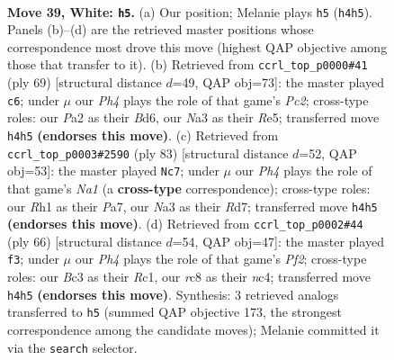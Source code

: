 \documentclass[11pt]{article}
\begin{document}
\clearpage

\begin{figure}[p]\centering
\begin{subfigure}{0.46\textwidth}\centering
\resizebox{\linewidth}{!}{%
\newchessgame
\chessboard[
  setfen={1rr3k1/pn3p2/1p2p1pp/8/2P4P/N1B1P3/PR2KPP1/7R w - - 1 39},
  showmover=false,
  pgfstyle=straightmove, color=movearrow, markmove={h4-h5}
]}
\caption{}
\end{subfigure}\hfill
\begin{subfigure}{0.46\textwidth}\centering
\resizebox{\linewidth}{!}{%
\newchessgame
\chessboard[
  setfen={8/2p3pk/3b1r2/P2pr2p/P3p3/2P3P1/5PNP/1R1R2K1 b - - 2 35},
  showmover=false,
  pgfstyle=straightmove, color=movearrow, markmove={c7-c6}
]}
\caption{}
\end{subfigure}
\\[4pt]
\begin{subfigure}{0.46\textwidth}\centering
\resizebox{\linewidth}{!}{%
\newchessgame
\chessboard[
  setfen={n7/p2r2p1/5k1p/1P3p2/PB1p4/1P4P1/2r2P2/3RR1K1 b - - 0 42},
  showmover=false,
  pgfstyle=straightmove, color=movearrow, markmove={a8-c7}
]}
\caption{}
\end{subfigure}\hfill
\begin{subfigure}{0.46\textwidth}\centering
\resizebox{\linewidth}{!}{%
\newchessgame
\chessboard[
  setfen={r2r4/k4pB1/4p2P/pbp1P3/2np2N1/8/2P2P2/R1R3K1 w - - 0 34},
  showmover=false,
  pgfstyle=straightmove, color=movearrow, markmove={f2-f3}
]}
\caption{}
\end{subfigure}
\caption{\textbf{Move 39, White: \texttt{h5}.} (a) Our position; Melanie plays \texttt{h5} (\texttt{h4h5}). Panels (b)--(d) are the retrieved master positions whose correspondence most drove this move (highest QAP objective among those that transfer to it). (b) Retrieved from \texttt{ccrl\_top\_p0000\#41} (ply 69) [structural distance $d$=49, QAP obj=73]: the master played \texttt{c6}; under $\mu$ our \emph{Ph4} plays the role of that game's \emph{Pc2}; cross-type roles: our \emph{P}a2 as their \emph{B}d6, our \emph{N}a3 as their \emph{R}e5; transferred move \texttt{h4h5} \textbf{(endorses this move)}. (c) Retrieved from \texttt{ccrl\_top\_p0003\#2590} (ply 83) [structural distance $d$=52, QAP obj=53]: the master played \texttt{Nc7}; under $\mu$ our \emph{Ph4} plays the role of that game's \emph{Na1} (a \textbf{cross-type} correspondence); cross-type roles: our \emph{R}h1 as their \emph{P}a7, our \emph{N}a3 as their \emph{R}d7; transferred move \texttt{h4h5} \textbf{(endorses this move)}. (d) Retrieved from \texttt{ccrl\_top\_p0002\#44} (ply 66) [structural distance $d$=54, QAP obj=47]: the master played \texttt{f3}; under $\mu$ our \emph{Ph4} plays the role of that game's \emph{Pf2}; cross-type roles: our \emph{B}c3 as their \emph{R}c1, our \emph{r}c8 as their \emph{n}c4; transferred move \texttt{h4h5} \textbf{(endorses this move)}. Synthesis: 3 retrieved analogs transferred to \texttt{h5} (summed QAP objective 173, the strongest correspondence among the candidate moves); Melanie committed it via the \texttt{search} selector.}
\label{fig:thought-m76}
\end{figure}
\end{document}
